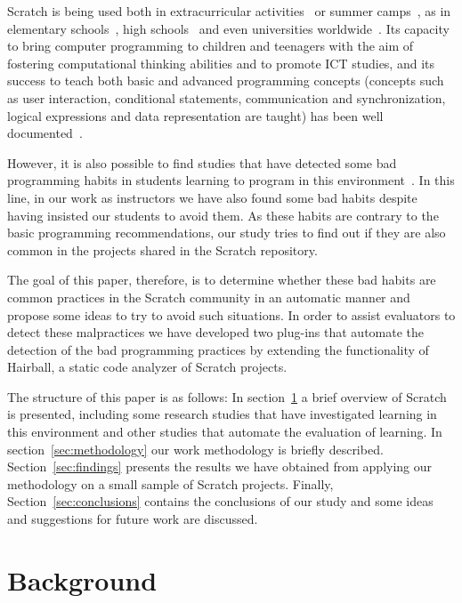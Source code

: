 \documentclass[conference]{format/IEEEtran}
\begin{document}
Scratch is being used both in extracurricular activities~\cite{kafai2010entering} or summer camps~\cite{adams2010scratching}, as in elementary schools~\cite{wilson2012evaluation}, high schools~\cite{meerbaum2013learning} and even universities worldwide~\cite{malan2007scratch}. Its capacity to bring computer programming to children and teenagers with the aim of fostering computational thinking abilities and to promote ICT studies, and its success to teach both basic and advanced programming concepts (concepts such as user interaction, conditional statements, communication and synchronization, logical expressions and data representation are taught) has been well documented~\cite{maloney2008programming, franklin2013assessment, wolz2009starting}.

However, it is also possible to find studies that have detected some bad programming habits in students learning to program in this environment~\cite{meerbaum2011habits}. In this line, in our work as instructors we have also found some bad habits despite having insisted our students to avoid them. As these habits are contrary to the basic programming recommendations, our study tries to find out if they are also common in the projects shared in the Scratch repository. 

The goal of this paper, therefore, is to determine whether these bad habits are common practices in the Scratch community in an automatic manner and propose some ideas to try to avoid such situations. In order to assist evaluators to detect these malpractices we have developed two plug-ins that automate the detection of the bad programming practices by extending the functionality of Hairball, a static code analyzer of Scratch projects.

The structure of this paper is as follows: In section~\ref{sec:background} a brief overview of Scratch is presented, including some research studies that have investigated learning in this environment and other studies that automate the evaluation of learning. In section~\ref{sec:methodology} our work methodology is briefly described. Section~\ref{sec:findings} presents the results we have obtained from applying our methodology on a small sample of Scratch projects. Finally, Section~\ref{sec:conclusions} contains the conclusions of our study and some ideas and suggestions for future work are discussed.

\section{Background}
\label{sec:background}
\end{document}
